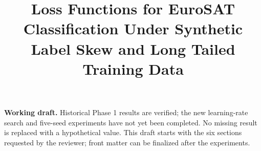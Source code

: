 \documentclass[conference]{IEEEtran}
\title{Loss Functions for EuroSAT Classification Under Synthetic Label Skew and Long Tailed Training Data}
\author{\IEEEauthorblockN{Author information to be supplied}}
\begin{document}
\maketitle
\noindent\textbf{Working draft.} Historical Phase 1 results are verified; the new learning-rate search and five-seed experiments have not yet been completed. No missing result is replaced with a hypothetical value. This draft starts with the six sections requested by the reviewer; front matter can be finalized after the experiments.








\end{document}
